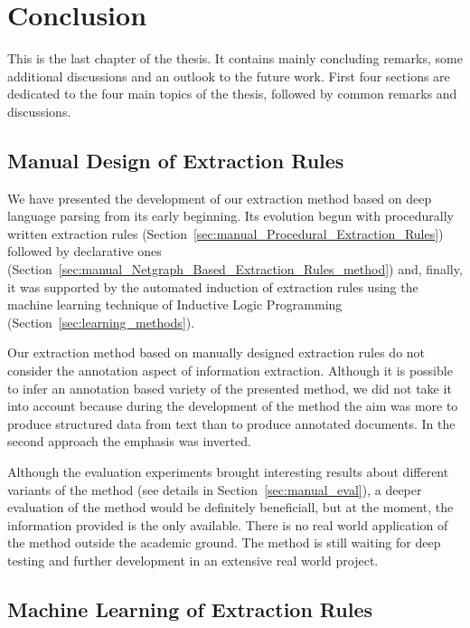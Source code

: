 \chapter{Conclusion} \label{sec:ch_conclusion}

This is the last chapter of the thesis. It contains mainly concluding remarks, some additional discussions and an outlook to the future work. First four sections are dedicated to the four main topics of the thesis, followed by common remarks and discussions. 



\section{Manual Design of Extraction Rules}
We have presented the development of our extraction method based on deep language parsing from its early beginning. Its evolution begun with procedurally written extraction rules (Section~\ref{sec:manual_Procedural_Extraction_Rules}) followed by declarative ones (Section~\ref{sec:manual_Netgraph_Based_Extraction_Rules_method}) and, finally, it was supported by the automated induction of extraction rules using the machine learning technique of Inductive Logic Programming (Section~\ref{sec:learning_methods}).


Our extraction method based on manually designed extraction rules do not consider the annotation aspect of information extraction. Although it is possible to infer an annotation based variety of the presented method, we did not take it into account because during the development of the method the aim was more to produce structured data from text than to produce annotated documents. In the second approach the emphasis was inverted. 

Although the evaluation experiments brought interesting results about different variants of the method (see details in Section~\ref{sec:manual_eval}), a deeper evaluation of the method would be definitely beneficiall, but at the moment, the information provided is the only available. There is no real world application of the method outside the academic ground. The method is still waiting for deep testing and further development in an extensive real world project.



\section{Machine Learning of Extraction Rules}

